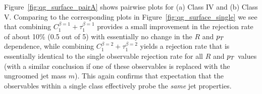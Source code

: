 Figure~\ref{fig:qg_surface_pairA} shows pairwise plots for (a) Class IV and (b) Class V.  Comparing to the corresponding plots
in Figure~\ref{fig:qg_surface_single} we see that combining $C_1^{\beta=1}+\tau_{1}^{\beta=1}$ provides a 
small improvement in the rejection rate of about 
10\% (0.5 out of 5) with essentially no change in the $R$ and $p_T$ dependence, while combining $C_1^{\beta=2}+\tau_{1}^{\beta=2}$   
yields a rejection rate that is essentially identical to the single observable rejection rate for all $R$ and $p_T$ values (with a similar conclusion if one
of these observables is replaced with the ungroomed jet mass $m$).  
This again confirms that expectation that the
observables within a single class effectively probe the \textit{same} jet properties.

 
%
\begin{figure}
\centering
{}
\\

\end{figure}
